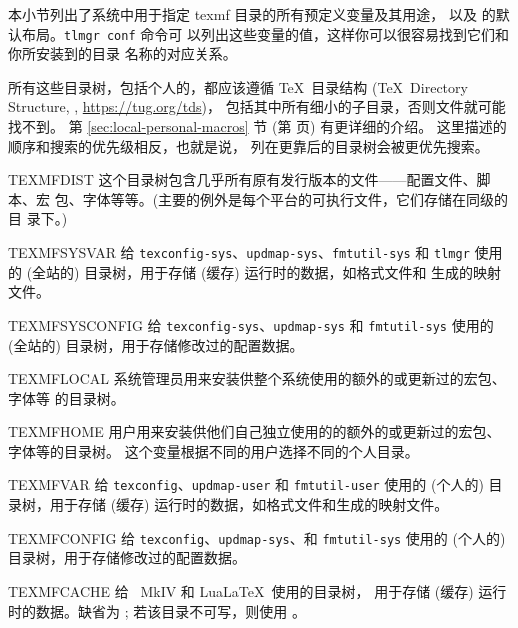\documentclass{article}
\begin{document}
本小节列出了系统中用于指定 texmf 目录的所有预定义变量及其用途，
以及 \TL{} 的默认布局。\texttt{tlmgr~conf} 命令可
以列出这些变量的值，这样你可以很容易找到它们和你所安装到的目录
名称的对应关系。

所有这些目录树，包括个人的，都应该遵循 \TeX\ 目录结构 (\TeX\
Directory Structure, \TDS, \url{https://tug.org/tds})，
包括其中所有细小的子目录，否则文件就可能找不到。
第 \ref{sec:local-personal-macros} 节 (第
\pageref{sec:local-personal-macros} 页) 有更详细的介绍。
这里描述的顺序和搜索的优先级相反，也就是说，
列在更靠后的目录树会被更优先搜索。

\begin{ttdescription}
\item [TEXMFDIST] 这个目录树包含几乎所有原有发行版本的文件——配置文件、脚本、宏
包、字体等等。(主要的例外是每个平台的可执行文件，它们存储在同级的  目
录下。)

\item [TEXMFSYSVAR] 给 \verb+texconfig-sys+、\verb+updmap-sys+、\verb+fmtutil-sys+
和 \verb+tlmgr+ 使用的 (全站的) 目录树，用于存储 (缓存) 运行时的数据，如格式文件和
生成的映射文件。

\item [TEXMFSYSCONFIG] 给 \verb+texconfig-sys+、\verb+updmap-sys+ 和
\verb+fmtutil-sys+ 使用的 (全站的) 目录树，用于存储修改过的配置数据。

\item [TEXMFLOCAL] 系统管理员用来安装供整个系统使用的额外的或更新过的宏包、字体等
的目录树。

\item [TEXMFHOME] 用户用来安装供他们自己独立使用的的额外的或更新过的宏包、字体等的目录树。
这个变量根据不同的用户选择不同的个人目录。

\item [TEXMFVAR] 给 \verb+texconfig+、\verb+updmap-user+ 和 \verb+fmtutil-user+
使用的 (个人的) 目录树，用于存储 (缓存) 运行时的数据，如格式文件和生成的映射文件。

\item [TEXMFCONFIG] 给 \verb+texconfig+、\verb+updmap-sys+、和 \verb+fmtutil-sys+
使用的 (个人的) 目录树，用于存储修改过的配置数据。

\item [TEXMFCACHE] 给 \ConTeXt\ MkIV 和 Lua\LaTeX\ 使用的目录树，
用于存储 (缓存) 运行时的数据。缺省为 ; 若该目录不可写，则使用
。
\end{ttdescription}
\end{document}
